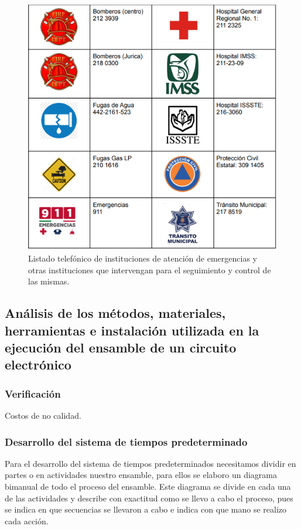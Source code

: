     \begin{figure}[H]
        \centering
        \includegraphics[scale=0.5]{35/Img/directorio.png}
        \caption{Listado telefónico de instituciones de atención de emergencias y otras instituciones que intervengan para el seguimiento y control de las mismas.}
    \end{figure}
    
    \subsection{Análisis de los métodos, materiales, herramientas e instalación utilizada en la ejecución del ensamble de un circuito electrónico}
    
    \subsubsection{Verificación}
    
    Costos de no calidad.
    \subsubsection{Desarrollo del sistema de tiempos predeterminado}
    
    Para el desarrollo del sistema de tiempos predeterminados necesitamos dividir en partes o en actividades nuestro ensamble, para ellos se elaboro un diagrama bimanual de todo el proceso del ensamble. Este diagrama se divide en cada una de las actividades y describe con exactitud como se llevo a cabo el proceso, pues se indica en que secuencias se llevaron a cabo e indica con que mano se realizo cada acción.
    
